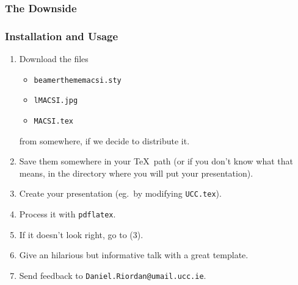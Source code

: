 \documentclass{beamer}
\newtheorem{caveat}[theorem]{Caveat}
\newtheorem{rmcorollary}[theorem]{Corollary}
\begin{document}
\begin{frame}
\frametitle{The Downside}




\end{frame}




\begin{frame}
   \frametitle{Installation and Usage}
\begin{enumerate}
\item<1-> Download the files
\begin{itemize}
\item \texttt{beamerthememacsi.sty}
\item \texttt{lMACSI.jpg}
\item \texttt{MACSI.tex}
\end{itemize}
from somewhere, if we decide to distribute it.

\item<2-> Save them somewhere in your \TeX \ path (or if you don't know
what that means, in the directory where you will put your
presentation).

\item<3-> Create your presentation (eg.~by modifying \texttt{UCC.tex}).

\item<4-> Process it with \texttt{pdflatex}.

\item<5-> If it doesn't look right, go to (3).

\item<6-> Give an hilarious but informative talk with a great template.

\item<7-> Send feedback to \texttt{Daniel.Riordan@umail.ucc.ie}.
\end{enumerate}
\end{frame}
\end{document}
